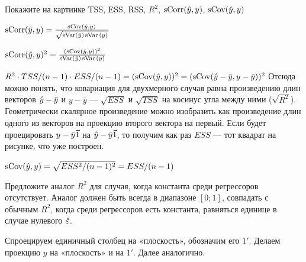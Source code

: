 \begin{problem}
Покажите на картинке TSS, ESS, RSS, $R^2$, $\operatorname{sCorr}(\hat{y},y)$, $\operatorname{sCov}(\hat{y},y)$





\begin{sol}
$\operatorname{sCorr}(\hat{y}, y)=\frac{\operatorname{sCov}(\hat{y}, y)}{\sqrt{\operatorname{sVar}(\hat{y})\operatorname{sVar}{(y)}}}$

$\operatorname{sCorr}(\hat{y}, y)^2=\frac{(\operatorname{sCov}(\hat{y}, y))^2}{\operatorname{sVar}(\hat{y})\operatorname{sVar}{(y)}} $

$R^2\cdot TSS/(n-1)\cdot ESS/(n-1)=(\operatorname{sCov}(\hat{y}, y))^2=(\operatorname{sCov}(\hat{y}-\bar y, y-\bar y))^2$
Отсюда можно понять, что ковариация для двухмерного случая равна произведению длин векторов $\hat{y}-\bar y$ и $y-\bar y$ — $\sqrt{ESS}$ и $\sqrt{TSS}$ на косинус угла между ними ($\sqrt{R^2}$). 
Геометрически скалярное произведение можно изобразить как произведение длин одного из векторов на проекцию второго вектора на первый. 
Если будет проецировать $y-\bar y\vec{1}$ на $\hat{y}-\bar y\vec{1}$, то получим как раз $ESS$ — тот квадрат на рисунке, что уже построен.


$\operatorname{sCov}(\hat{y}, y)=\sqrt{ESS^2/(n-1)^2}=ESS/(n-1)$


\end{sol}
\end{problem}


\begin{problem}
Предложите аналог $R^2$ для случая, когда константа среди регрессоров отсутствует. Аналог должен быть всегда в диапазоне $[0;1]$, совпадать с обычным $R^2$, когда среди регрессоров есть константа, равняться единице в случае нулевого $\hat{\varepsilon}$.


\begin{sol}
Спроецируем единичный столбец на «плоскость», обозначим его $1'$. Делаем проекцию $y$ на «плоскость» и на $1'$. Далее аналогично.
\end{sol}
\end{problem}



